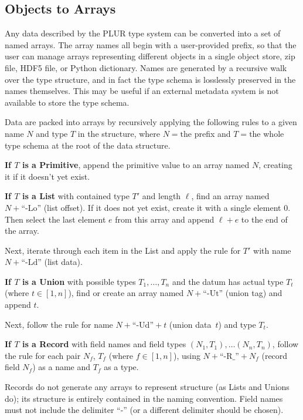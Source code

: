 \documentclass[10pt, conference, compsocconf]{IEEEtran}
\begin{document}
\subsection{Objects to Arrays}

Any data described by the PLUR type system can be converted into a set of named arrays. The array names all begin with a user-provided prefix, so that the user can manage arrays representing different objects in a single object store, zip file, HDF5 file, or Python dictionary. Names are generated by a recursive walk over the type structure, and in fact the type schema is losslessly preserved in the names themselves. This may be useful if an external metadata system is not available to store the type schema.

Data are packed into arrays by recursively applying the following rules to a given name $N$ and type $T$ in the structure, where $N = \mbox{the}$ prefix and $T = \mbox{the}$ whole type schema at the root of the data structure.

{\bf If $T$ is a Primitive}, append the primitive value to an array named $N$, creating it if it doesn't yet exist.

{\bf If $T$ is a List} with contained type $T'$ and length $\ell$, find an array named $N + \mbox{``-Lo''}$ (list offset). If it does not yet exist, create it with a single element $0$. Then select the last element $e$ from this array and append $\ell + e$ to the end of the array.

Next, iterate through each item in the List and apply the rule for $T'$ with name $N + \mbox{``-Ld''}$ (list data).

{\bf If $T$ is a Union} with possible types $T_1, \ldots, T_n$ and the datum has actual type $T_t$ (where $t \in [1, n]$), find or create an array named $N + \mbox{``-Ut''}$ (union tag) and append $t$.

Next, follow the rule for name $N + \mbox{``-Ud''} + t$ (union data~$t$) and type $T_t$.

{\bf If $T$ is a Record} with field names and field types $(N_1, T_1), \ldots (N_n, T_n)$, follow the rule for each pair $N_f$, $T_f$ (where $f \in [1, n]$), using $N + \mbox{``-R\_''} + N_f$ (record field $N_f$) as a name and $T_f$ as a type.

Records do not generate any arrays to represent structure (as Lists and Unions do); its structure is entirely contained in the naming convention. Field names must not include the delimiter ``-'' (or a different delimiter should be chosen).
\end{document}
